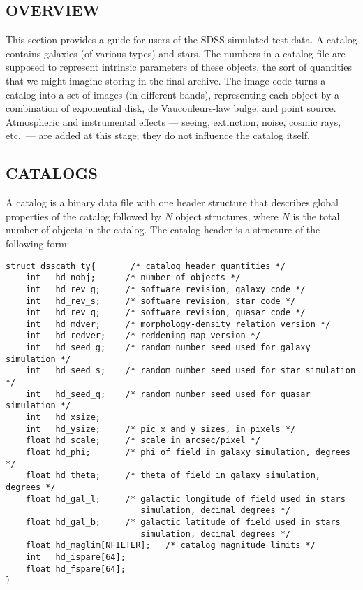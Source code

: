 \def\bigskip{\vspace{20pt}}
\def\smallstep{vspace{10pt}}
\def\ltsima{$\; \buildrel < \over \sim \;$}
\def\gtsima{$\; \buildrel > \over \sim \;$}

\bigskip
\begin{center}
\section{OVERVIEW}
\smallskip
\end{center}

This section provides a guide for users of the SDSS simulated test data.
A catalog contains galaxies (of various types) and stars.
The numbers in a catalog file are supposed to represent intrinsic
parameters of these objects, the sort of quantities that we might imagine
storing in the final archive.  The image code turns a catalog into a
set of images (in different bands), representing each
object by a combination of exponential disk, de Vaucouleurs-law bulge, 
and point source.  Atmospheric and instrumental effects --- 
seeing, extinction, noise, cosmic rays, etc.\ --- are added at this
stage; they do not influence the catalog itself.

\bigskip
\begin{center}
\section{CATALOGS}
\end{center}
\smallskip

A catalog is a binary data file with one header structure that describes
global properties of the catalog followed by $N$ object structures,
where $N$ is the total number of objects in the catalog.
The catalog header is a structure of the following form:
\begin{verbatim}
struct dsscath_ty{       /* catalog header quantities */
    int   hd_nobj;      /* number of objects */
    int   hd_rev_g;     /* software revision, galaxy code */
    int   hd_rev_s;     /* software revision, star code */
    int   hd_rev_q;     /* software revision, quasar code */
    int   hd_mdver;     /* morphology-density relation version */
    int   hd_redver;    /* reddening map version */
    int   hd_seed_g;    /* random number seed used for galaxy simulation */
    int   hd_seed_s;    /* random number seed used for star simulation */
    int   hd_seed_q;    /* random number seed used for quasar simulation */
    int   hd_xsize;
    int   hd_ysize;     /* pic x and y sizes, in pixels */
    float hd_scale;     /* scale in arcsec/pixel */
    float hd_phi;       /* phi of field in galaxy simulation, degrees */
    float hd_theta;     /* theta of field in galaxy simulation, degrees */
    float hd_gal_l;     /* galactic longitude of field used in stars 
                           simulation, decimal degrees */
    float hd_gal_b;     /* galactic latitude of field used in stars 
                           simulation, decimal degrees */
    float hd_maglim[NFILTER];   /* catalog magnitude limits */
    int   hd_ispare[64];
    float hd_fspare[64];
}
\end{verbatim}

